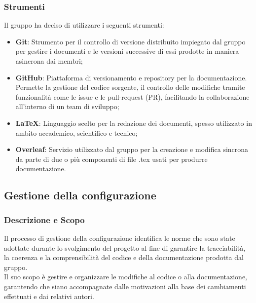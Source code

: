 \documentclass[10pt]{article}
\begin{document}
\begin{justify}
    \subsubsection{Strumenti}
    Il gruppo ha deciso di utilizzare i seguenti strumenti:
    \begin{itemize}
        \item \textbf{Git}: Strumento per il controllo di versione distribuito impiegato dal gruppo per gestire i documenti e le versioni successive di essi prodotte in maniera asincrona dai membri;
        \item \textbf{GitHub}: Piattaforma di versionamento e repository per la documentazione. Permette la gestione del codice sorgente, il controllo delle modifiche tramite funzionalità come le issue e le pull-request (PR), facilitando la collaborazione all’interno di un team di sviluppo;
        \item \textbf{\LaTeX}: Linguaggio scelto per la redazione dei documenti, spesso utilizzato in ambito accademico, scientifico e tecnico;
        \item \textbf{Overleaf}: Servizio utilizzato dal gruppo per la creazione e modifica sincrona da parte di due o più componenti di file .tex usati per produrre documentazione.
    \end{itemize}

    \subsection{Gestione della configurazione}
    \label{gestione-configurazione}
    \subsubsection{Descrizione e Scopo}
    Il processo di gestione della configurazione identifica le norme che sono state adottate durante lo svolgimento del progetto al fine di garantire la tracciabilità, la coerenza e la comprensibilità del codice e della documentazione prodotta dal gruppo.\\
    Il suo scopo è gestire e organizzare le modifiche al codice o alla documentazione, garantendo che siano accompagnate dalle motivazioni alla base dei cambiamenti effettuati e dai relativi autori.


\end{justify}
\end{document}
